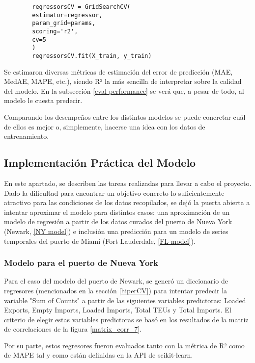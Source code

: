 \documentclass[12pt]{article}
\begin{document}
	\begin{verbatim}
		regressorsCV = GridSearchCV(
		estimator=regressor,
		param_grid=params,
		scoring='r2',
		cv=5
		)
		regressorsCV.fit(X_train, y_train)
	\end{verbatim}

	Se estimaron diversas métricas de estimación del error de predicción (MAE, MedAE, MAPE, etc.), siendo R² la más sencilla de interpretar sobre la calidad del modelo. En la subsección \ref{eval performance} se verá que, a pesar de todo, al modelo le cuesta predecir.
	
	Comparando los desempeños entre los distintos modelos se puede concretar cuál de ellos es mejor o, simplemente, hacerse una idea con los datos de entrenamiento.
	
	\subsection{\label{implementacionPractica}Implementación Práctica del Modelo}
 	En este apartado, se describen las tareas realizadas para llevar a cabo el proyecto. Dado la dificultad para encontrar un objetivo concreto lo suficientemente atractivo para las condiciones de los datos recopilados, se dejó la puerta abierta a intentar aproximar el modelo para distintos casos: una aproximación de un modelo de regresión a partir de los datos curados del puerto de Nueva York (Newark, \ref{NY model}) e inclusión una predicción para un modelo de series temporales del puerto de Miami (Fort Lauderdale, \ref{FL model}).
 	
 	\subsubsection{\label{NY model} Modelo para el puerto de Nueva York}
 	Para el caso del modelo del puerto de Newark, se generó un diccionario de regresores (mencionados en la sección \ref{hiperCV}) para intentar predecir la variable "Sum of Counts" a partir de las siguientes variables predictoras: Loaded Exports, Empty Imports, Loaded Imports, Total TEUs y Total Imports. El criterio de elegir estas variables predictoras se basó en los resultados de la matriz de correlaciones de la figura \ref{matrix_corr_7}.
 	
 	Por su parte, estos regresores fueron evaluados tanto con la métrica de R² como de MAPE tal y como están definidas en la API de scikit-learn.
 	
\end{document}
